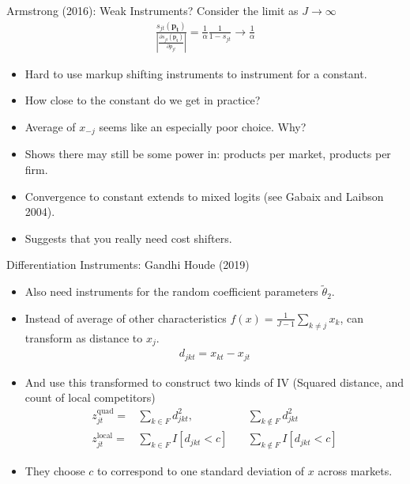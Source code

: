 \begin{frame}{Armstrong (2016): Weak Instruments?}
Consider the limit as $J \rightarrow \infty$
\begin{eqnarray*}
\frac{s_{jt}(\symbf{p_t})}{\left|\frac{\partial s_{jt}(\symbf{p_t})}{\partial p_{jt}}\right|} = \frac{1}{\alpha} \frac{1}{1-s_{jt}} \rightarrow \frac{1}{\alpha}
\end{eqnarray*}
\begin{itemize}
\item Hard to use markup shifting instruments to instrument for a constant.
\item How close to the constant do we get in practice?
\item Average of $x_{-j}$ seems like an especially poor choice. Why?
\item Shows there may still be some power in: products per market, products per firm.
\item Convergence to constant extends to mixed logits (see Gabaix and Laibson 2004).
\item Suggests that you really need cost shifters.
\end{itemize}
\end{frame}

\begin{frame}{Differentiation Instruments: Gandhi Houde (2019)}
\small
\begin{itemize}
\item Also need instruments for the random coefficient parameters $\widetilde{\theta}_2$.
\item Instead of average of other characteristics $f(x) = \frac{1}{J-1} \sum_{k \neq j} x_k$, can transform as distance to $x_j$.
\begin{eqnarray*}
d_{jkt} =  x_{kt} - x_{jt}  
\end{eqnarray*}
\item And use this transformed to construct two kinds of IV (Squared distance, and count of local competitors)
\begin{eqnarray*}
z_{jt}^{\text{quad}} =& \sum_{k  \in F}  d_{jkt}^2,  \quad &\sum_{k \notin F}  d_{jkt}^2 \\
z_{jt}^{\text{local}} =& \sum_{k \in F}  I[d_{jkt} < c]   \quad &\sum_{k \notin F}   I[d_{jkt} < c]
\end{eqnarray*}
\item They choose $c$ to correspond to one standard deviation of $x$ across markets.
\end{itemize}
\end{frame}




